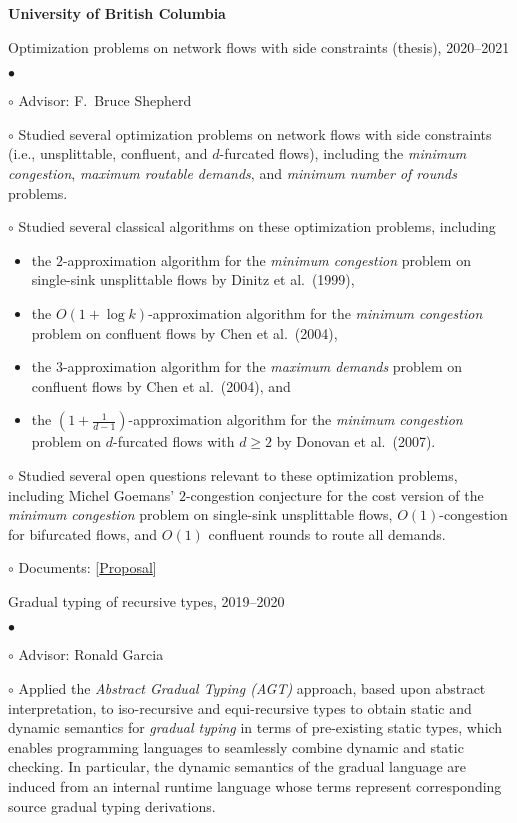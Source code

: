 \documentclass[margin,line]{res}
\newenvironment{list2}{
  \begin{list}{$\bullet$}{%
      \setlength{\itemsep}{0in}
      \setlength{\parsep}{0in} \setlength{\parskip}{0in}
      \setlength{\topsep}{0in} \setlength{\partopsep}{0in}
      \setlength{\leftmargin}{0.2in}}}{\end{list}}
\newenvironment{list3}{
  \begin{list}{\ding{113}}{%
      \setlength{\itemsep}{0.05in}
      \setlength{\parsep}{0.025in} \setlength{\parskip}{0in}
      \setlength{\topsep}{0in} \setlength{\partopsep}{0in}
      \setlength{\leftmargin}{0.17in}}}{\end{list}}
\begin{document}
\begin{resume}
{\bf University of British Columbia}\\
\vspace*{-.1in}
\begin{list3}
\item[] Optimization problems on network flows with side constraints (thesis), 2020--2021
  \begin{list2}
  \item[$\circ$] Advisor: F.\ Bruce Shepherd
  \item[$\circ$] Studied several optimization problems on network flows with side constraints (i.e., unsplittable, confluent, and $d$-furcated flows), including the \emph{minimum congestion}, \emph{maximum routable demands}, and \emph{minimum number of rounds} problems.
  \item[$\circ$] Studied several classical algorithms on these optimization problems, including
  \begin{itemize}
    \item the $2$-approximation algorithm for the \emph{minimum congestion} problem on single-sink unsplittable flows by Dinitz et al.\ (1999),
    \item the $O(1 + \log k)$-approximation algorithm for the \emph{minimum congestion} problem on confluent flows by Chen et al.\ (2004),
    \item the $3$-approximation algorithm for the \emph{maximum demands} problem on confluent flows by Chen et al.\ (2004), and
    \item the $(1 + \frac{1}{d - 1})$-approximation algorithm for the \emph{minimum congestion} problem on $d$-furcated flows with $d \geq 2$ by Donovan et al.\ (2007).
  \end{itemize}
  \item[$\circ$] Studied several open questions relevant to these optimization problems, including Michel Goemans' $2$-congestion conjecture for the cost version of the \emph{minimum congestion} problem on single-sink unsplittable flows, $O(1)$-congestion for bifurcated flows, and $O(1)$ confluent rounds to route all demands.
  \item[$\circ$] Documents: [\href{http://ypan.me/docs/thesis-proposal.pdf}{Proposal}]
  \end{list2}
\item[] Gradual typing of recursive types, 2019--2020
  \begin{list2}
  \item[$\circ$] Advisor: Ronald Garcia
  \item[$\circ$] Applied the \emph{Abstract Gradual Typing (AGT)} approach, based upon abstract interpretation, to iso-recursive and equi-recursive types to obtain static and dynamic semantics for \emph{gradual typing} in terms of pre-existing static types, which enables programming languages to seamlessly combine dynamic and static checking. In particular, the dynamic semantics of the gradual language are induced from an internal runtime language whose terms represent corresponding source gradual typing derivations.

\end{list2}
\end{list3}
\end{resume}
\end{document}
